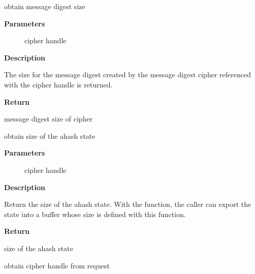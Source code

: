\documentclass[a4paper,8pt,english]{sphinxmanual}
\begin{document}
\begin{fulllineitems}
\label{crypto/api-digest:c.crypto_ahash_digestsize}
obtain message digest size

\end{fulllineitems}


\textbf{Parameters}
\begin{description}
\item[{}] \leavevmode
cipher handle

\end{description}

\textbf{Description}

The size for the message digest created by the message digest cipher
referenced with the cipher handle is returned.

\textbf{Return}

message digest size of cipher

\begin{fulllineitems}
\label{crypto/api-digest:c.crypto_ahash_statesize}
obtain size of the ahash state

\end{fulllineitems}


\textbf{Parameters}
\begin{description}
\item[{}] \leavevmode
cipher handle

\end{description}

\textbf{Description}

Return the size of the ahash state. With the {\hyperref[crypto/api\string-digest:c.crypto_ahash_export]{}}
function, the caller can export the state into a buffer whose size is
defined with this function.

\textbf{Return}

size of the ahash state

\begin{fulllineitems}
\label{crypto/api-digest:c.crypto_ahash_reqtfm}
obtain cipher handle from request

\end{fulllineitems}
\end{document}

